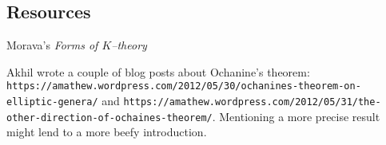 \documentclass[12pt]{book}
\begin{document}
\subsection*{Resources}

Morava's \textit{Forms of $K$--theory}

Akhil wrote a couple of blog posts about Ochanine's theorem: \texttt{https://amathew.wordpress.com/2012/05/30/ochanines-theorem-on-elliptic-genera/} and \texttt{https://amathew.wordpress.com/2012/05/31/the-other-direction-of-ochaines-theorem/}. Mentioning a more precise result might lend to a more beefy introduction.
\end{document}

